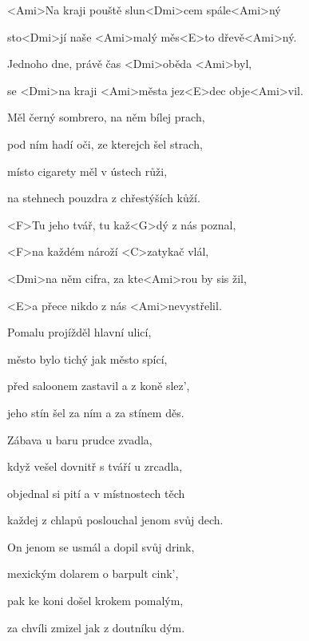 

\zs
<Ami>Na kraji pouště slun<Dmi>cem spále<Ami>ný

sto<Dmi>jí naše <Ami>malý měs<E>to dřevě<Ami>ný.

Jednoho dne, právě čas <Dmi>oběda <Ami>byl,

se <Dmi>na kraji <Ami>města jez<E>dec obje<Ami>vil.
\ks

\zs
Měl černý sombrero, na něm bílej prach,

pod ním hadí oči, ze kterejch šel strach,

místo cigarety měl v ústech růži,

na stehnech pouzdra z chřestýších kůží.
\ks

\zr
<F>Tu jeho tvář, tu kaž<G>dý z nás poznal,

<F>na každém nároží <C>zatykač vlál,

<Dmi>na něm cifra, za kte<Ami>rou by sis žil,

<E>a přece nikdo z nás <Ami>nevystřelil.
\kr

\zs
Pomalu projížděl hlavní ulicí,

město bylo tichý jak město spící,

před saloonem zastavil a z koně slez',

jeho stín šel za ním a za stínem děs.
\ks

\zs
Zábava u baru prudce zvadla,

když vešel dovnitř s tváří u zrcadla,

objednal si pití a v místnostech těch

každej z chlapů poslouchal jenom svůj dech.
\ks

\zr \kr

\zs
On jenom se usmál a dopil svůj drink,

mexickým dolarem o barpult cink',

pak ke koni došel krokem pomalým,

za chvíli zmizel jak z doutníku dým.
\ks

\kp
